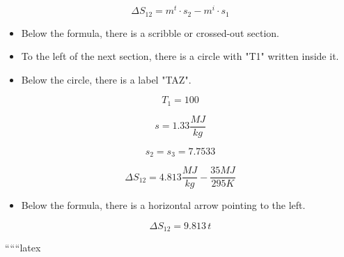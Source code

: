 \[
\Delta S_{12} = m^t \cdot s_2 - m^i \cdot s_1
\]

\begin{itemize}
    \item Below the formula, there is a scribble or crossed-out section.
    \item To the left of the next section, there is a circle with "T1" written inside it.
    \item Below the circle, there is a label "TAZ".
\end{itemize}

\[
T_1 = 100
\]

\[
s = 1.33 \frac{MJ}{kg}
\]

\[
s_2 = s_3 = 7.7533
\]

\[
\Delta S_{12} = 4.813 \frac{MJ}{kg} - \frac{35 MJ}{295 K}
\]

\begin{itemize}
    \item Below the formula, there is a horizontal arrow pointing to the left.
\end{itemize}

\[
\Delta S_{12} = 9.813 \, t
\]

``````latex



